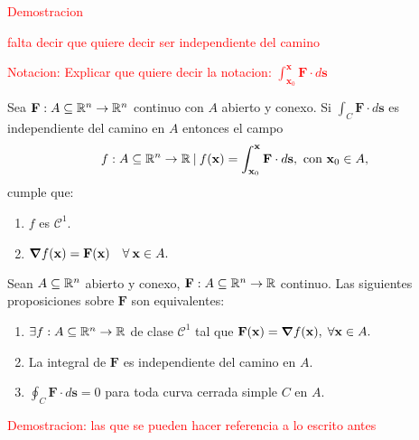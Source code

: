 \textcolor{red}{Demostracion}




\textcolor{red}{falta decir que quiere decir ser  independiente del camino}

\textcolor{red}{Notacion:   Explicar que quiere decir  la notacion: $\int_{\mathbf{x}_0}^{\mathbf{x}}\mathbf{F}\cdot d\mathbf{s}$}


\begin{theorem}
   Sea  $\mathbf{F}:A\subseteq\mathbb{R}^n \to \mathbb{R}^n$ continuo con  $A$ abierto y conexo. Si  $\int_C \mathbf{F}\cdot d\mathbf{s}$ es independiente del camino en $A$  entonces el campo
    $$f:A\subseteq\mathbb{R}^n\to\mathbb{R}\: | \:f(\mathbf{x})=\int_{\mathbf{x}_0}^{\mathbf{x}}\mathbf{F}\cdot d\mathbf{s},  \mbox{ con }  \mathbf{x}_0\in A, $$
    cumple que: 
    \begin{enumerate}
        \item $f$ es $\mathcal{C}^1$.
        \item $\grad f(\mathbf{x})=\mathbf{F}(\mathbf{x})\quad\forall\:\mathbf{x}\in A.$
    \end{enumerate}
\end{theorem}

\begin{theorem}
    Sean $A\subseteq\mathbb{R}^n$ abierto y conexo, $\mathbf{F}:A\subseteq\mathbb{R}^n\to\mathbb{R}$ continuo. Las siguientes proposiciones sobre $\mathbf{F}$ son equivalentes:
    \begin{enumerate}
        \item $\exists f:A\subseteq\mathbb{R}^n\to\mathbb{R}$ de clase $\mathcal{C}^1$ tal que $\mathbf{F}(\mathbf{x})=\grad f(\mathbf{x}),\;\forall\mathbf{x}\in A.$ 
        \item La integral de $\mathbf{F}$ es independiente del camino en $A$.
        \item $\oint_C\mathbf{F}\cdot d\mathbf{s}=0$ para toda curva cerrada simple $C$ en $A$.
    \end{enumerate}
\end{theorem}

\textcolor{red}{Demostracion: las que se pueden hacer referencia a lo escrito antes}

